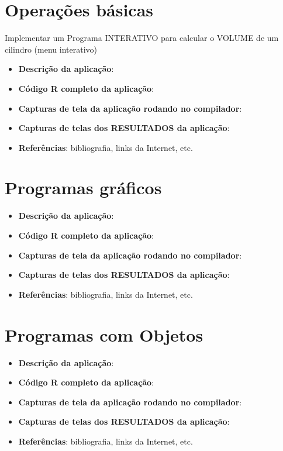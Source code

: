     \section{Opera\c{c}\~{o}es b\'{a}sicas}
    Implementar um Programa INTERATIVO para calcular o VOLUME de um cilindro (menu interativo)
    \begin{itemize}
      \item \textbf{Descri\c{c}\~{a}o da aplica\c{c}\~{a}o}:
      \item \textbf{C\'{o}digo R completo da aplica\c{c}\~{a}o}:
      \item \textbf{Capturas de tela da aplica\c{c}\~{a}o rodando no compilador}:
      \item \textbf{Capturas de telas dos RESULTADOS da aplica\c{c}\~{a}o}:
      \item \textbf{Refer\^{e}ncias}: bibliografia, links da Internet, etc.
    \end{itemize}

    \section{Programas gr\'{a}ficos}
    \begin{itemize}
      \item \textbf{Descri\c{c}\~{a}o da aplica\c{c}\~{a}o}:
      \item \textbf{C\'{o}digo R completo da aplica\c{c}\~{a}o}:
      \item \textbf{Capturas de tela da aplica\c{c}\~{a}o rodando no compilador}:
      \item \textbf{Capturas de telas dos RESULTADOS da aplica\c{c}\~{a}o}:
      \item \textbf{Refer\^{e}ncias}: bibliografia, links da Internet, etc.
    \end{itemize}


    \section{Programas com Objetos}
    \begin{itemize}
      \item \textbf{Descri\c{c}\~{a}o da aplica\c{c}\~{a}o}:
      \item \textbf{C\'{o}digo R completo da aplica\c{c}\~{a}o}:
      \item \textbf{Capturas de tela da aplica\c{c}\~{a}o rodando no compilador}:
      \item \textbf{Capturas de telas dos RESULTADOS da aplica\c{c}\~{a}o}:
      \item \textbf{Refer\^{e}ncias}: bibliografia, links da Internet, etc.
    \end{itemize}

